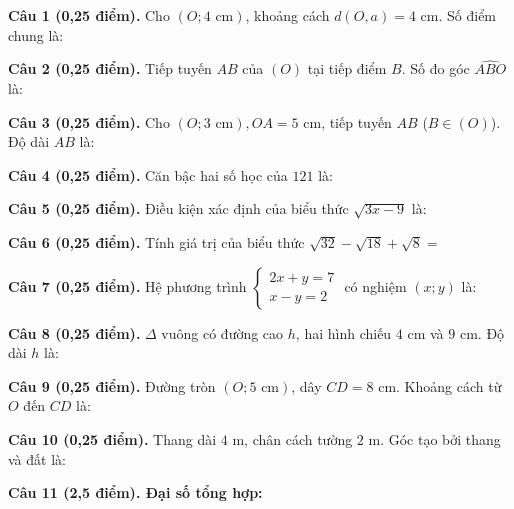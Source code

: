 \documentclass[12pt,a4paper]{article}
\begin{document}
\vspace{1.2mm}
\noindent\textbf{Câu 1 (0,25 điểm).} Cho $(O; 4\text{ cm})$, khoảng cách $d(O, a) = 4\text{ cm}$. Số điểm chung là: \par\vspace{0.5mm}
\noindent\textbf{Câu 2 (0,25 điểm).} Tiếp tuyến $AB$ của $(O)$ tại tiếp điểm $B$. Số đo góc $\widehat{ABO}$ là: \par\vspace{0.5mm}
\noindent\textbf{Câu 3 (0,25 điểm).} Cho $(O; 3\text{ cm}), OA = 5\text{ cm}$, tiếp tuyến $AB$ ($B \in (O)$). Độ dài $AB$ là: \par\vspace{0.5mm}
\noindent\textbf{Câu 4 (0,25 điểm).} Căn bậc hai số học của $121$ là: \par\vspace{0.5mm}
\noindent\textbf{Câu 5 (0,25 điểm).} Điều kiện xác định của biểu thức $\sqrt{3x - 9}$ là: \par\vspace{0.5mm}
\noindent\textbf{Câu 6 (0,25 điểm).} Tính giá trị của biểu thức $\sqrt{32} - \sqrt{18} + \sqrt{8} = $ \par\vspace{0.5mm}
\noindent\textbf{Câu 7 (0,25 điểm).} Hệ phương trình $\begin{cases} 2x + y = 7 \\ x - y = 2 \end{cases}$ có nghiệm $(x; y)$ là: \par\vspace{0.5mm}
\noindent\textbf{Câu 8 (0,25 điểm).} $\Delta$ vuông có đường cao $h$, hai hình chiếu $4\text{ cm}$ và $9\text{ cm}$. Độ dài $h$ là: \par\vspace{0.5mm}
\noindent\textbf{Câu 9 (0,25 điểm).} Đường tròn $(O; 5\text{ cm})$, dây $CD = 8\text{ cm}$. Khoảng cách từ $O$ đến $CD$ là: \par\vspace{0.5mm}
\noindent\textbf{Câu 10 (0,25 điểm).} Thang dài $4\text{ m}$, chân cách tường $2\text{ m}$. Góc tạo bởi thang và đất là: \par\vspace{0.5mm}
\vspace{0.8mm}
\noindent\textbf{Câu 11 (2,5 điểm). Đại số tổng hợp:}
\vspace{0.6mm}
\end{document}
